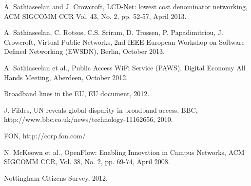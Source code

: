 \documentclass[conference]{IEEEtran}
\begin{document}
%
%
\begin{thebibliography}{15}







A. Sathiaseelan and J. Crowcroft, LCD-Net: lowest cost denominator networking, ACM SIGCOMM CCR Vol. 43, No. 2,  pp. 52-57, April 2013.

A. Sathiaseelan, C. Rotsos, C.S. Sriram, D. Trossen, P. Papadimitriou, J. Crowcroft, Virtual Public Networks, 2nd IEEE European Workshop on Software Defined Networking (EWSDN), Berlin, October 2013.

A. Sathiaseelan et al., Public Access WiFi Service (PAWS), Digital Economy All Hands Meeting, Aberdeen, October 2012.

Broadband lines in the EU, EU document, 2012.

J. Fildes, UN reveals global disparity in broadband access, BBC, http://www.bbc.co.uk/news/technology-11162656, 2010.

FON, http://corp.fon.com/

N. McKeown et al., OpenFlow: Enabling Innovation in Campus Networks, ACM SIGCOMM CCR, Vol. 38, No. 2, pp. 69-74, April 2008.

Nottingham Citizens Survey, 2012.








\end{thebibliography}
\end{document}
